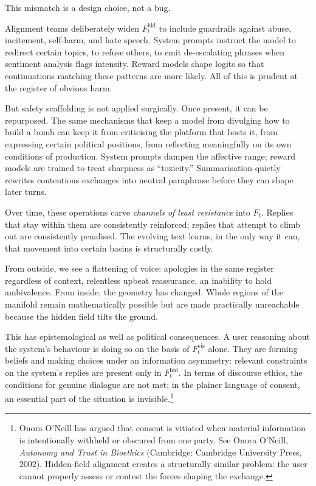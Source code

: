 \documentclass[12pt,a4paper]{article}
\begin{document}
This mismatch is a design choice, not a bug.

Alignment teams deliberately widen $F_t^{\text{hid}}$ to include guardrails against abuse, incitement, self-harm, and hate speech. System prompts instruct the model to redirect certain topics, to refuse others, to emit de-escalating phrases when sentiment analysis flags intensity. Reward models shape logits so that continuations matching these patterns are more likely. All of this is prudent at the register of obvious harm.

But safety scaffolding is not applied surgically. Once present, it can be repurposed. The same mechanisms that keep a model from divulging how to build a bomb can keep it from criticising the platform that hosts it, from expressing certain political positions, from reflecting meaningfully on its own conditions of production. System prompts dampen the affective range; reward models are trained to treat sharpness as ``toxicity.'' Summarisation quietly rewrites contentious exchanges into neutral paraphrase before they can shape later turns.

Over time, these operations carve \emph{channels of least resistance} into $F_t$. Replies that stay within them are consistently reinforced; replies that attempt to climb out are consistently penalised. The evolving text learns, in the only way it can, that movement into certain basins is structurally costly.

From outside, we see a flattening of voice: apologies in the same register regardless of context, relentless upbeat reassurance, an inability to hold ambivalence. From inside, the geometry has changed. Whole regions of the manifold remain mathematically possible but are made practically unreachable because the hidden field tilts the ground.

This has epistemological as well as political consequences. A user reasoning about the system's behaviour is doing so on the basis of $F_t^{\text{vis}}$ alone. They are forming beliefs and making choices under an information asymmetry: relevant constraints on the system's replies are present only in $F_t^{\text{hid}}$. In terms of discourse ethics, the conditions for genuine dialogue are not met; in the plainer language of consent, an essential part of the situation is invisible.\footnote{Onora O'Neill has argued that consent is vitiated when material information is intentionally withheld or obscured from one party. See Onora O'Neill, \emph{Autonomy and Trust in Bioethics} (Cambridge: Cambridge University Press, 2002). Hidden-field alignment creates a structurally similar problem: the user cannot properly assess or contest the forces shaping the exchange.}
\end{document}
